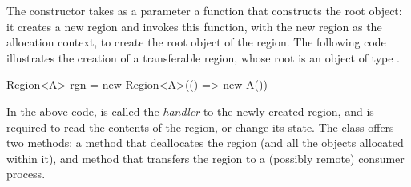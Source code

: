 The  constructor takes as a parameter a function that
constructs the root object: it creates a new region and invokes this
function, with the new region as the allocation context, to create the
root object of the region. The following code illustrates the
creation of a transferable region, whose root is an object of type
.
\begin{codejava} 
  Region<A> rgn = new Region<A>(() => new A())
\end{codejava} 
In the above code,  is called the \emph{handler} to the newly
created region, and is required to read the contents of the region, or
change its state. The class  offers two methods: a 
method that deallocates the region (and all the objects allocated
within it), and  method that transfers the region to a
(possibly remote) consumer process. 



